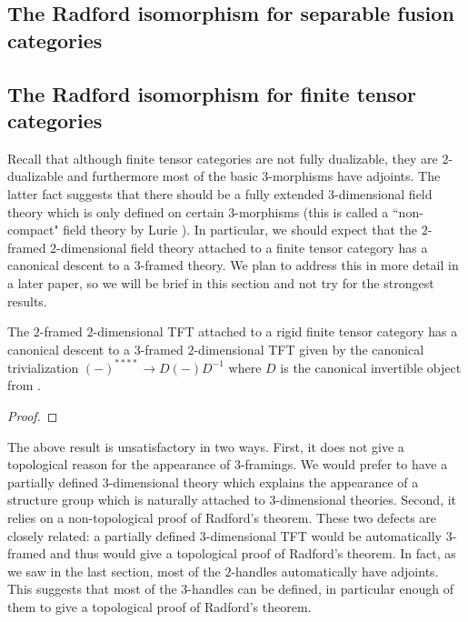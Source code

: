 \documentclass{amsart}
\begin{document}
\subsection{The Radford isomorphism for separable fusion categories}


\subsection{The Radford isomorphism for finite tensor categories}


Recall that although finite tensor categories are not fully dualizable, they are $2$-dualizable and furthermore most of the basic $3$-morphisms have adjoints.  The latter fact suggests that there should be a fully extended $3$-dimensional field theory which is only defined on certain $3$-morphisms (this is called a ``non-compact" field theory by Lurie \cite[\S4.2]{lurie-ch}).  In particular, we should expect that the $2$-framed $2$-dimensional field theory attached to a finite tensor category has a canonical descent to a $3$-framed theory.  We plan to address this in more detail in a later paper, so we will be brief in this section and not try for the strongest results.

\begin{theorem}
The $2$-framed $2$-dimensional TFT attached to a rigid finite tensor category has a canonical descent to a $3$-framed $2$-dimensional TFT given by the canonical trivialization $(-)^{****} \rightarrow D (-) D^{-1}$ where $D$ is the canonical invertible object from \cite{MR2097289}.
\end{theorem}
\begin{proof}
\NScomm{[In process.]}  %
\end{proof}

The above result is unsatisfactory in two ways.  First, it does not give a topological reason for the appearance of $3$-framings.  We would prefer to have a partially defined $3$-dimensional theory which explains the appearance of a structure group which is naturally attached to $3$-dimensional theories.  Second, it relies on a non-topological proof of Radford's theorem.  These two defects are closely related: a partially defined $3$-dimensional TFT would be automatically $3$-framed and thus would give a topological proof of Radford's theorem.  In fact, as we saw in the last section, most of the $2$-handles automatically have adjoints.  This suggests that most of the $3$-handles can be defined, in particular enough of them to give a topological proof of Radford's theorem.
\end{document}
